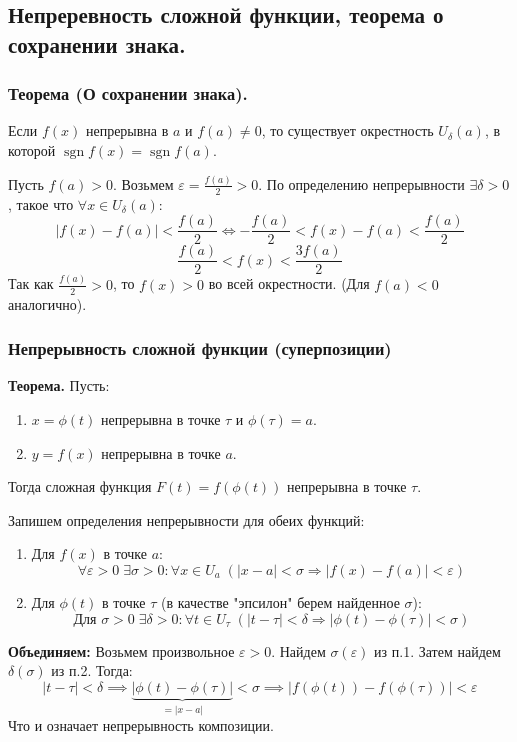 \subsection{Непреревность сложной функции, теорема о сохранении знака.}

\subsubsection*{Теорема (О сохранении знака).}
Если $f(x)$ непрерывна в $a$ и $f(a) \neq 0$, то существует окрестность $U_\delta(a)$, в которой $\operatorname{sgn} f(x) = \operatorname{sgn} f(a)$.

\begin{tcolorbox}[title=Доказательство]
	Пусть $f(a) > 0$. Возьмем $\varepsilon = \frac{f(a)}{2} > 0$.
	По определению непрерывности $\exists \delta > 0$, такое что $\forall x \in U_\delta(a)$:
	\[ |f(x) - f(a)| < \frac{f(a)}{2} \Leftrightarrow -\frac{f(a)}{2} < f(x) - f(a) < \frac{f(a)}{2} \]
	\[ \frac{f(a)}{2} < f(x) < \frac{3f(a)}{2} \]
	Так как $\frac{f(a)}{2} > 0$, то $f(x) > 0$ во всей окрестности. (Для $f(a) < 0$ аналогично).
\end{tcolorbox}

\subsubsection*{Непрерывность сложной функции (суперпозиции)}

\textbf{Теорема.}
Пусть:
\begin{enumerate}
	\item $x = \phi(t)$ непрерывна в точке $\tau$ и $\phi(\tau) = a$.
	\item $y = f(x)$ непрерывна в точке $a$.
\end{enumerate}
Тогда сложная функция $F(t) = f(\phi(t))$ непрерывна в точке $\tau$.

\begin{tcolorbox}[title=Доказательство]
	Запишем определения непрерывности для обеих функций:
	\begin{enumerate}
		\item Для $f(x)$ в точке $a$:
		\[ \forall \varepsilon > 0 \; \exists \sigma > 0: \forall x \in U_a \; (|x - a| < \sigma \Rightarrow |f(x) - f(a)| < \varepsilon) \]
		
		\item Для $\phi(t)$ в точке $\tau$ (в качестве "эпсилон" берем найденное $\sigma$):
		\[ \text{Для } \sigma > 0 \; \exists \delta > 0: \forall t \in U_\tau \; (|t - \tau| < \delta \Rightarrow |\phi(t) - \phi(\tau)| < \sigma) \]
	\end{enumerate}
	
	\textbf{Объединяем:}
	Возьмем произвольное $\varepsilon > 0$. Найдем $\sigma(\varepsilon)$ из п.1. Затем найдем $\delta(\sigma)$ из п.2.
	Тогда:
	\[ |t - \tau| < \delta \implies \underbrace{|\phi(t) - \phi(\tau)|}_{=|x - a|} < \sigma \implies |f(\phi(t)) - f(\phi(\tau))| < \varepsilon \]
	Что и означает непрерывность композиции.
\end{tcolorbox}

